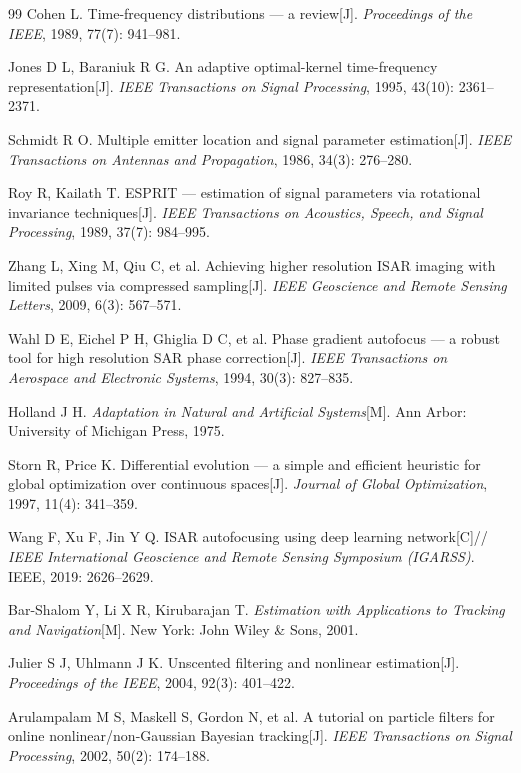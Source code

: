 \documentclass[12pt, a4paper]{article}
\begin{document}
\begin{thebibliography}{99}
Cohen L.
Time-frequency distributions --- a review[J].
\textit{Proceedings of the IEEE}, 1989, 77(7): 941--981.

Jones D L, Baraniuk R G.
An adaptive optimal-kernel time-frequency representation[J].
\textit{IEEE Transactions on Signal Processing}, 1995, 43(10): 2361--2371.

Schmidt R O.
Multiple emitter location and signal parameter estimation[J].
\textit{IEEE Transactions on Antennas and Propagation}, 1986, 34(3): 276--280.

Roy R, Kailath T.
ESPRIT --- estimation of signal parameters via rotational invariance techniques[J].
\textit{IEEE Transactions on Acoustics, Speech, and Signal Processing}, 1989, 37(7): 984--995.

Zhang L, Xing M, Qiu C, et al.
Achieving higher resolution ISAR imaging with limited pulses via compressed sampling[J].
\textit{IEEE Geoscience and Remote Sensing Letters}, 2009, 6(3): 567--571.

Wahl D E, Eichel P H, Ghiglia D C, et al.
Phase gradient autofocus --- a robust tool for high resolution SAR phase correction[J].
\textit{IEEE Transactions on Aerospace and Electronic Systems}, 1994, 30(3): 827--835.

Holland J H.
\textit{Adaptation in Natural and Artificial Systems}[M].
Ann Arbor: University of Michigan Press, 1975.

Storn R, Price K.
Differential evolution --- a simple and efficient heuristic for global optimization over continuous spaces[J].
\textit{Journal of Global Optimization}, 1997, 11(4): 341--359.

Wang F, Xu F, Jin Y Q.
ISAR autofocusing using deep learning network[C]//
\textit{IEEE International Geoscience and Remote Sensing Symposium (IGARSS)}.
IEEE, 2019: 2626--2629.

Bar-Shalom Y, Li X R, Kirubarajan T.
\textit{Estimation with Applications to Tracking and Navigation}[M].
New York: John Wiley \& Sons, 2001.

Julier S J, Uhlmann J K.
Unscented filtering and nonlinear estimation[J].
\textit{Proceedings of the IEEE}, 2004, 92(3): 401--422.

Arulampalam M S, Maskell S, Gordon N, et al.
A tutorial on particle filters for online nonlinear/non-Gaussian Bayesian tracking[J].
\textit{IEEE Transactions on Signal Processing}, 2002, 50(2): 174--188.


\end{thebibliography}
\end{document}
